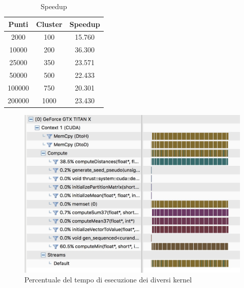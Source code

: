 \documentclass[10pt,twocolumn,letterpaper]{article}
\begin{document}
\begin{table}[H]
\centering
\caption{Speedup}
\label{speedup}
\begin{tabular}{ccc}
\hline
\textbf{Punti} & \textbf{Cluster} & \textbf{Speedup} \\ \hline
2000           & 100              & 15.760           \\
10000          & 200              & 36.300           \\
25000          & 350              & 23.571           \\
50000          & 500              & 22.433           \\
100000         & 750              & 20.301           \\
200000         & 1000             & 23.430           \\ \hline
\end{tabular}
\end{table}

\begin{figure}[H]
  \centering
    \includegraphics[width=\columnwidth]{Image/screen.jpg}
  \caption{Percentuale del tempo di esecuzione dei diversi kernel}
  \label{fig:screen}
\end{figure}
\end{document}
